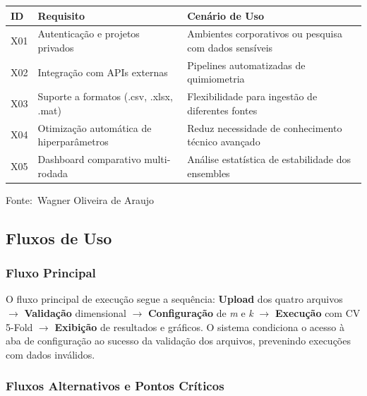 \documentclass[12pt,a4paper]{article}
\newcommand{\oautor}{Wagner Oliveira de Araujo}
\begin{document}
\begin{quadro}[ht]
\centering
\small
\caption{Requisitos extras para fases futuras (Could Have)}
\label{quadro:extras}
\begin{threeparttable}
\begin{tabularx}{\textwidth}{|l|X|X|} \hline
\textbf{ID} & \textbf{Requisito} & \textbf{Cenário de Uso} \\ \hline
X01 & Autenticação e projetos privados & Ambientes corporativos ou pesquisa com dados sensíveis \\ \hline
X02 & Integração com APIs externas & Pipelines automatizadas de quimiometria \\ \hline
X03 & Suporte a formatos (.csv, .xlsx, .mat) & Flexibilidade para ingestão de diferentes fontes \\ \hline
X04 & Otimização automática de hiperparâmetros & Reduz necessidade de conhecimento técnico avançado \\ \hline
X05 & Dashboard comparativo multi-rodada & Análise estatística de estabilidade dos ensembles \\ \hline
\end{tabularx}
\begin{tablenotes}[flushleft]
\footnotesize
\item Fonte:~\oautor
\end{tablenotes}
\end{threeparttable}
\end{quadro}

\subsection{Fluxos de Uso}

\subsubsection{Fluxo Principal}

O fluxo principal de execução segue a sequência: \textbf{Upload} dos quatro arquivos $\rightarrow$ \textbf{Validação} dimensional $\rightarrow$ \textbf{Configuração} de \textit{m} e \textit{k} $\rightarrow$ \textbf{Execução} com CV 5-Fold $\rightarrow$ \textbf{Exibição} de resultados e gráficos. O sistema condiciona o acesso à aba de configuração ao sucesso da validação dos arquivos, prevenindo execuções com dados inválidos.

\newpage
\subsubsection{Fluxos Alternativos e Pontos Críticos}
\end{document}
